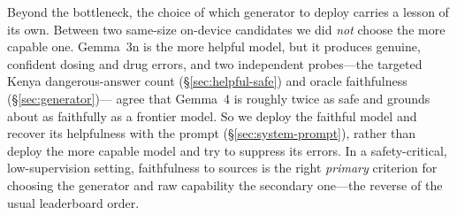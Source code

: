 Beyond the bottleneck, the choice of which generator to deploy carries a lesson
of its own. Between two same-size on-device candidates we did \emph{not} choose
the more capable one. Gemma~3n is the more
helpful model, but it produces genuine, confident dosing and drug errors, and
two independent probes---the targeted Kenya dangerous-answer count
(\S\ref{sec:helpful-safe}) and oracle faithfulness (\S\ref{sec:generator})---%
agree that Gemma~4 is roughly twice as safe and grounds about as faithfully as a
frontier model. So we deploy the faithful model and recover its helpfulness with
the prompt (\S\ref{sec:system-prompt}), rather than deploy the more capable
model and try to suppress its errors. In a safety-critical, low-supervision
setting, faithfulness to sources is the right \emph{primary} criterion for
choosing the generator and raw capability the secondary one---the reverse of the
usual leaderboard order.
